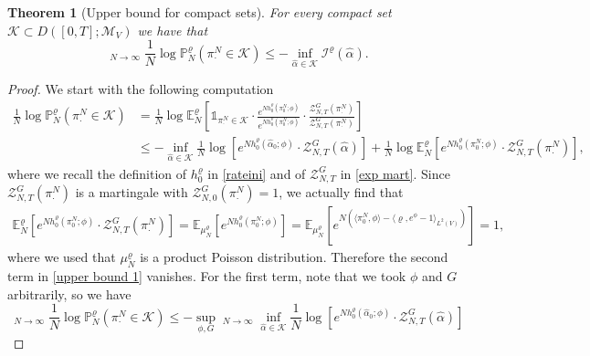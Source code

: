 \documentclass[11pt]{article}
\numberwithin{equation}{section}
\DeclareMathOperator*\uplim{\overline{lim}}
\theoremstyle{definition}
\theoremstyle{plain}
\newtheorem{Theorem}{Theorem}[section]
\newcommand{\E}{\mathbb{E}}
\newcommand{\nn}{\nonumber}
\begin{document}
\begin{Theorem}[Upper bound for compact sets] \label{upper bound compact}
    For every compact set $\mathcal{K} \subset  D([0,T];\mathcal{M}_V)$ we have that 
    \begin{equation}
        \uplim_{N\to\infty} \frac{1}{N} \log \mathbb{P}_N^{\varrho}(\pi^N_{\cdot} \in \mathcal{K}) \leq -\inf_{\widehat{\alpha} \in \mathcal{K}} \mathcal{I}^{\varrho}(\widehat{\alpha}).
    \end{equation}
\end{Theorem}
\begin{proof}
We start with the following computation
    \begin{align}\label{upper bound 1}
        \frac{1}{N} \log \mathbb{P}_N^{\varrho}(\pi^N_{\cdot} \in \mathcal{K})
        &= \frac{1}{N}\log \E_N^{\varrho}\left[\mathds{1}_{\pi^N_{\cdot} \in \mathcal{K}} \cdot \frac{e^{Nh_0^{\varrho}(\pi^N_{0};\phi)}}{e^{Nh_0^{\varrho}(\pi^N_{0};\phi)}}\cdot \frac{\mathcal{Z}^G_{N,T}(\pi^N_{\cdot})}{\mathcal{Z}^G_{N,T}(\pi^N_{\cdot})} \right]\\
        &\nn\leq -\inf_{\widehat{\alpha}\in\mathcal{K}} \frac{1}{N}\log \left[ e^{Nh_0^{\varrho}(\widehat{\alpha}_0;\phi)}\cdot \mathcal{Z}_{N,T}^G(\widehat{\alpha}) \right] + \frac{1}{N}\log \E^{\varrho}_N\left[ e^{Nh_0^{\varrho}(\pi^N_{0};\phi)}\cdot \mathcal{Z}^G_{N,T}(\pi^N_{\cdot}) \right],
    \end{align}
where we recall the definition of $h_0^\varrho$ in \eqref{rateini} and of $\mathcal{Z}^G_{N,T}$ in \eqref{exp mart}. Since $\mathcal{Z}^G_{N,T}(\pi^N_{\cdot})$ is a martingale with $\mathcal{Z}^G_{N,0}(\pi^N_{\cdot})=1$, we actually find that 
    \begin{align}
        \E^{\varrho}_N\left[e^{Nh_0^{\varrho}(\pi^N_{0};\phi)} \cdot \mathcal{Z}^G_{N,T}(\pi^N_{\cdot})\right] = \E_{\mu^{\varrho}_N}\left[e^{Nh_0^{\varrho}(\pi^N_{0};\phi)}\right] = \E_{\mu^{\varrho}_N}\left[e^{N\left(\langle \pi^N_{0},\phi\rangle - \langle\varrho,e^\phi-1\rangle_{L^2(V)}\right)}\right] = 1,
    \end{align}
where we used that $\mu^{\varrho}_N$ is a product Poisson distribution. Therefore the second term in \eqref{upper bound 1} vanishes. For the first term, note that we took $\phi$ and $G$ arbitrarily, so we have
    \begin{equation}
        \uplim_{N\to\infty} \frac{1}{N} \log \mathbb{P}_N^{\varrho}(\pi^N_{\cdot} \in \mathcal{K})
        \leq - \sup_{\phi,G}  \uplim_{N\to\infty} \inf_{\widehat{\alpha} \in \mathcal{K}}  \frac{1}{N}\log \left[ e^{Nh_0^{\varrho}(\widehat{\alpha}_0;\phi)}\cdot \mathcal{Z}_{N,T}^G(\widehat{\alpha}) \right] 

\end{equation}
\end{proof}
\end{document}
